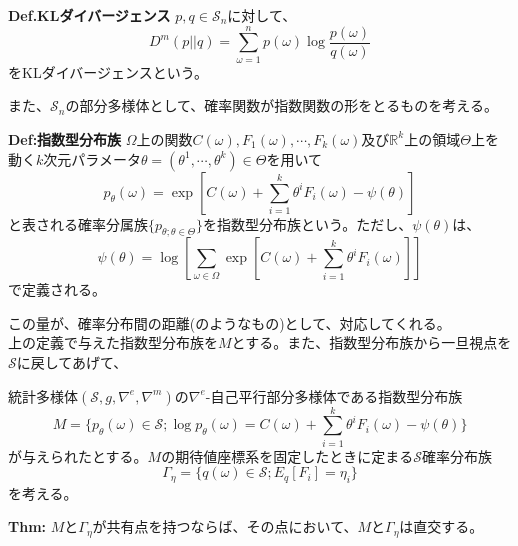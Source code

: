 \documentclass[a4paper,11pt]{jsarticle}
\numberwithin{equation}{section}
\begin{document}
\begin{itembox}[l]{\textbf{Def.KLダイバージェンス}}
    $p,q \in \mathcal{S}_n$に対して、
    \begin{equation}
        D^m(p||q) = \sum_{\omega=1}^{n} p(\omega) \log \frac{p(\omega)}{q(\omega)}
    \end{equation}
    をKLダイバージェンスという。
\end{itembox}

また、$\mathcal{S}_n$の部分多様体として、確率関数が指数関数の形をとるものを考える。
\begin{itembox}[l]{\textbf{Def:指数型分布族}}
    $\Omega$上の関数$C(\omega),F_1(\omega),\cdots,F_k(\omega)$及び$\mathbb{R}^k$上の領域$\Theta$上を動く$k$次元パラメータ$\theta = (\theta^1,\cdots,\theta^k) \in \Theta$を用いて
    \begin{equation}
        p_{\theta}(\omega) = \exp\left[ C(\omega) + \sum_{i=1}^{k} \theta^i F_i(\omega) - \psi(\theta) \right]
    \end{equation}
    と表される確率分属族$\{p_{\theta;\theta \in \Theta}\}$を指数型分布族という。ただし、$\psi(\theta)$は、
    \begin{equation}
        \psi(\theta) = \log \left[ \sum_{\omega \in \Omega} \exp\left[ C(\omega) + \sum_{i=1}^{k} \theta^i F_i(\omega) \right] \right]
    \end{equation}
    で定義される。  
\end{itembox}
この量が、確率分布間の距離(のようなもの)として、対応してくれる。\\

上の定義で与えた指数型分布族を$M$とする。また、指数型分布族から一旦視点を$\mathcal{S}$に戻してあげて、

統計多様体$(\mathcal{S},g,\nabla^{e},\nabla^{m})$の$\nabla^{e}$-自己平行部分多様体である指数型分布族
\begin{equation}
    M = \{p_{\theta}(\omega) \in \mathcal{S}; \log p_{\theta}(\omega) = C(\omega) + \sum_{i=1}^{k} \theta^i F_i(\omega) - \psi(\theta) \}
\end{equation}
が与えられたとする。$M$の期待値座標系を固定したときに定まる$\mathcal{S}$確率分布族
\begin{equation}
    \Gamma_{\eta} = \{q(\omega) \in \mathcal{S}; E_q [F_i] = \eta_i \}
\end{equation}
を考える。

\begin{itembox}[l]{\textbf{Thm:}}
    $M$と$\Gamma_{\eta}$が共有点を持つならば、その点において、$M$と$\Gamma_{\eta}$は直交する。
\end{itembox}
\end{document}
